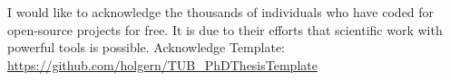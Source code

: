 

\begin{acknowledgements}      %

I would like to acknowledge the thousands of individuals who have coded for open-source projects for free. It is due to their efforts that 
scientific work with powerful tools is possible.
Acknowledge Template: \url{https://github.com/holgern/TUB_PhDThesisTemplate}


\end{acknowledgements}



